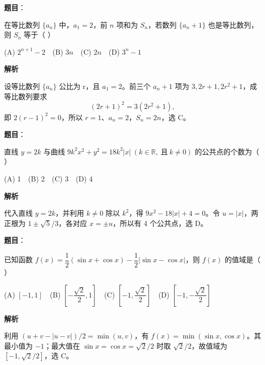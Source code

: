 \begin{answer}

\textbf{题目}：

在等比数列 $\{a_n\}$ 中，$a_1=2$，前 $n$ 项和为 $S_n$，若数列 $\{a_n+1\}$ 也是等比数列，则 $S_n$ 等于（ ）

(A) $2^{n+1}-2$　(B) $3n$　(C) $2n$　(D) $3^n-1$

\textbf{解析}

设等比数列 $\{a_n\}$ 公比为 r，且 $a_1=2$。前三个 $a_n+1$ 项为 $3,2r+1,2r^2+1$，成等比数列要求
\nopagebreak[4]
\[
(2r+1)^2=3(2r^2+1),
\]
即 $2(r-1)^2=0$，所以 $r=1$、$a_n=2$，$S_n=2n$，选 C。


\end{answer}
\begin{answer}

\textbf{题目}：

直线 $y=2k$ 与曲线 $9k^2x^2+y^2=18k^2|x|\ (k\in\mathbb R,\ \text{且}\ k\ne0)$ 的公共点的个数为（ ）

(A) 1　(B) 2　(C) 3　(D) 4

\textbf{解析}

代入直线 $y=2k$，并利用 $k\ne0$ 除以 $k^2$，得 $9x^2-18|x|+4=0$。令 $u=|x|$，两正根为 $1\pm\sqrt5/3$，各对应 $x=\pm u$，所以有 4 个公共点，选 D。


\end{answer}
\begin{answer}

\textbf{题目}：

已知函数 $f(x)=\dfrac12(\sin x+\cos x)-\dfrac12|\sin x-\cos x|$，则 $f(x)$ 的值域是（ ）

(A) $[-1,1]$　(B) $[-\dfrac{\sqrt2}{2},1]$　(C) $[-1,\dfrac{\sqrt2}{2}]$　(D) $[-1,-\dfrac{\sqrt2}{2}]$

\textbf{解析}

利用 $(u+v-|u-v|)/2=\min(u,v)$，有 $f(x)=\min(\sin x,\cos x)$。其最小值为 $-1$；最大值在 $\sin x=\cos x=\sqrt2/2$ 时取 $\sqrt2/2$，故值域为 $[-1,\sqrt2/2]$，选 C。


\end{answer}
